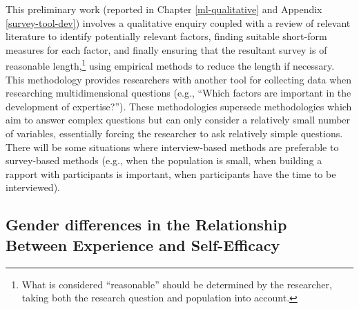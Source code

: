 \documentclass[
  12pt,
  a4paper,
]{book}
\begin{document}
This preliminary work (reported in Chapter \ref{ml-qualitative} and Appendix \ref{survey-tool-dev}) involves a qualitative enquiry coupled with a review of relevant literature to identify potentially relevant factors, finding suitable short-form measures for each factor, and finally ensuring that the resultant survey is of reasonable length,\footnote{What is considered ``reasonable'' should be determined by the researcher, taking both the research question and population into account.} using empirical methods to reduce the length if necessary. This methodology provides researchers with another tool for collecting data when researching multidimensional questions (e.g., ``Which factors are important in the development of expertise?''). These methodologies supersede methodologies which aim to answer complex questions but can only consider a relatively small number of variables, essentially forcing the researcher to ask relatively simple questions. There will be some situations where interview-based methods are preferable to survey-based methods (e.g., when the population is small, when building a rapport with participants is important, when participants have the time to be interviewed).

\hypertarget{gender-differences-in-the-relationship-between-experience-and-self-efficacy}{%
\subsection{Gender differences in the Relationship Between Experience and Self-Efficacy}\label{gender-differences-in-the-relationship-between-experience-and-self-efficacy}}
\end{document}
